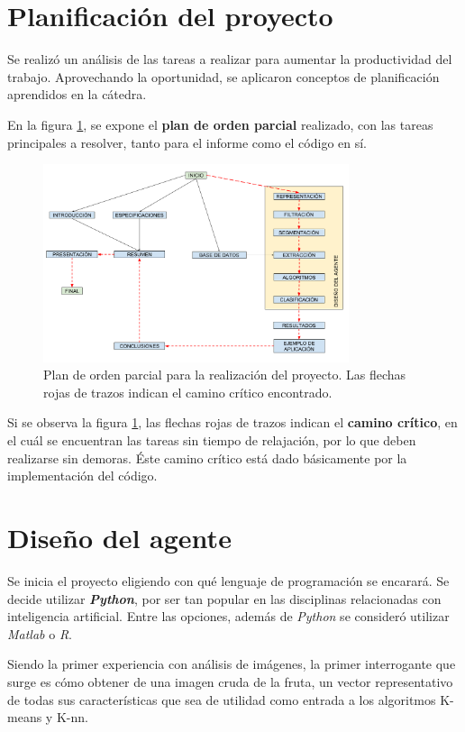\documentclass[10pt,a4paper]{article}
\begin{document}
\section{Planificación del proyecto}
Se realizó un análisis de las tareas a realizar para aumentar la productividad del trabajo. Aprovechando la oportunidad, se aplicaron conceptos de planificación aprendidos en la cátedra.

En la figura \ref{plan-parcial}, se expone el \textbf{plan de orden parcial} realizado, con las tareas principales a resolver, tanto para el informe como el código en sí.

\begin{figure}[h]
\centering
\includegraphics[width=0.8\textwidth]{imgs/plan-parcial.png}
\caption{Plan de orden parcial para la realización del proyecto. Las flechas rojas de trazos indican el camino crítico encontrado.}
\label{plan-parcial}
\end{figure}

Si se observa la figura \ref{plan-parcial}, las flechas rojas de trazos indican el \textbf{camino crítico}, en el cuál se encuentran las tareas sin tiempo de relajación, por lo que deben realizarse sin demoras. Éste camino crítico está dado básicamente por la implementación del código.

\section{Diseño del agente}
Se inicia el proyecto eligiendo con qué lenguaje de programación se encarará. Se decide utilizar \textbf{\textit{Python}}, por ser tan popular en las disciplinas relacionadas con inteligencia artificial. Entre las opciones, además de \textit{Python} se consideró utilizar \textit{Matlab} o \textit{R}.

Siendo la primer experiencia con análisis de imágenes, la primer interrogante que surge es cómo obtener de una imagen cruda de la fruta, un vector representativo de todas sus características que sea de utilidad como entrada a los algoritmos K-means y K-nn.
\end{document}
